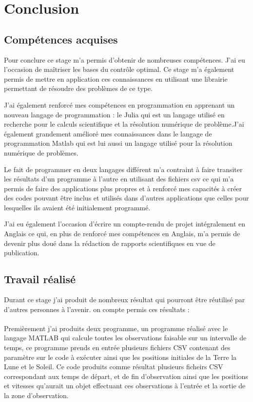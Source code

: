 \documentclass[12pt]{article} %
\begin{document}
		\section{Conclusion}
		\subsection{Compétences acquises}
		Pour conclure ce stage m'a permis d'obtenir de nombreuses compétences.
		 J'ai eu l'occasion de maîtriser les bases du contrôle optimal. Ce stage m'a également permis de mettre en application ces connaissances en utilisant une librairie permettant de résoudre des problèmes de ce type.
		
		J'ai également renforcé mes compétences en programmation en apprenant un nouveau langage de programmation : le Julia qui est un langage utilisé en recherche pour le calculs scientifique et la résolution numérique de problème.J'ai également grandement amélioré mes connaissances dans le langage de programmation Matlab qui est lui aussi un langage utilisé pour la résolution numérique de problèmes.
		
		Le fait de programmer en deux langages différent m'a contraint à faire transiter les résultats d'un programme à l'autre en utilisant des fichiers csv ce qui m'a permis de faire des applications plus propres et à renforcé mes capacités à créer des codes pouvant être inclus et utilisés dans d'autres applications que celles pour lesquelles ils avaient été initialement programmé.
		
		J'ai eu également l'occasion d'écrire un compte-rendu de projet intégralement en Anglais ce qui, en plus de renforcé mes compétences en Anglais, m'a permis de devenir plus doué dans la rédaction de rapports scientifiques en vue de publication.
		
		\subsection{Travail réalisé}
		
		Durant ce stage j'ai produit de nombreux résultat qui pourront être réutilisé par d'autres personnes à l'avenir. on compte permis ces résultats : 
		\\ \\
		Premièrement j'ai produits deux programme, un programme réalisé avec le langage MATLAB qui calcule toutes les observations faisable sur un intervalle de temps, ce programme prends en entrée plusieurs fichiers CSV contenant des paramètre sur le code à exécuter ainsi que les positions initiales de la Terre la Lune et le Soleil. Ce code produits comme résultat plusieurs ficheirs CSV correspondant aux temps de départ, et de fin d'observation ainsi que les positions et vitesses qu'aurait un objet effectuant ces observations à l'entrée et la sortie de la zone d'observation.
		
\end{document}
